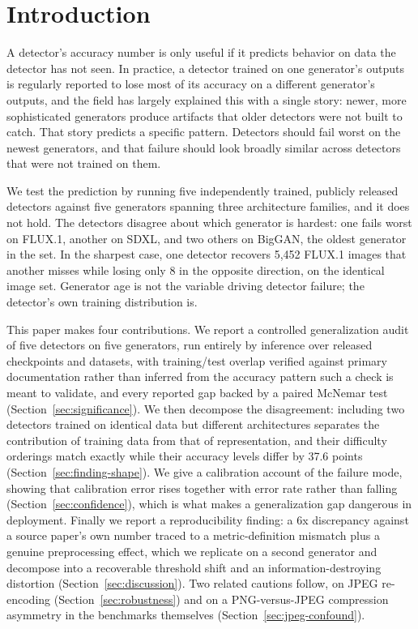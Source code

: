 \documentclass[3p,times,procedia]{elsarticle}
\begin{document}

\vspace*{-6pt}

\section{Introduction}
\label{sec:intro}

A detector's accuracy number is only useful if it predicts behavior on data
the detector has not seen. In practice, a detector trained on one
generator's outputs is regularly reported to lose most of its accuracy on a
different generator's outputs, and the field has largely explained this with
a single story: newer, more sophisticated generators produce artifacts that
older detectors were not built to catch. That story predicts a specific
pattern. Detectors should fail worst on the newest generators, and that
failure should look broadly similar across detectors that were not trained
on them.

We test the prediction by running five independently trained, publicly
released detectors against five generators spanning three architecture
families, and it does not hold. The detectors disagree about which
generator is hardest: one fails worst on FLUX.1, another on SDXL, and two
others on BigGAN, the oldest generator in the set. In the sharpest case,
one detector recovers 5{,}452 FLUX.1 images that another misses while
losing only 8 in the opposite direction, on the identical image set.
Generator age is not the variable driving detector failure; the detector's
own training distribution is.

This paper makes four contributions. We report a controlled generalization
audit of five detectors on five generators, run entirely by inference over
released checkpoints and datasets, with training/test overlap verified
against primary documentation rather than inferred from the accuracy
pattern such a check is meant to validate, and every reported gap backed by
a paired McNemar test (Section~\ref{sec:significance}). We then decompose
the disagreement: including two detectors trained on identical data but
different architectures separates the contribution of training data from
that of representation, and their difficulty orderings match exactly while
their accuracy levels differ by 37.6 points
(Section~\ref{sec:finding-shape}). We give a calibration account of the
failure mode, showing that calibration error rises together with error rate
rather than falling (Section~\ref{sec:confidence}), which is what makes a
generalization gap dangerous in deployment. Finally we report a
reproducibility finding: a 6x discrepancy against a source paper's own
number traced to a metric-definition mismatch plus a genuine preprocessing
effect, which we replicate on a second generator and decompose into a
recoverable threshold shift and an information-destroying distortion
(Section~\ref{sec:discussion}). Two related cautions follow, on JPEG
re-encoding (Section~\ref{sec:robustness}) and on a PNG-versus-JPEG
compression asymmetry in the benchmarks themselves
(Section~\ref{sec:jpeg-confound}).
\end{document}
